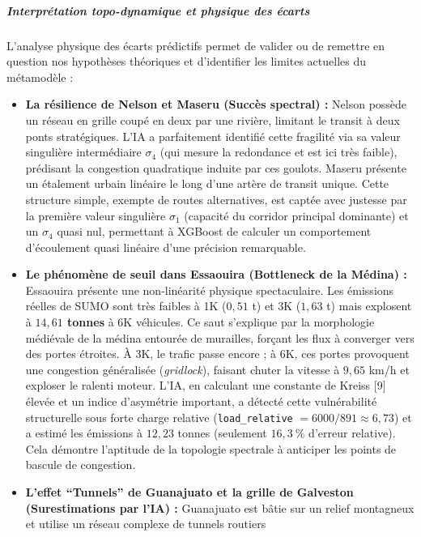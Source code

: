 \documentclass[10pt, a4paper]{article}
\begin{document}
\subparagraph{Interprétation topo-dynamique et physique des
écarts}\label{interpruxe9tation-topo-dynamique-et-physique-des-uxe9carts}

L'analyse physique des écarts prédictifs permet de valider ou de
remettre en question nos hypothèses théoriques et d'identifier les
limites actuelles du métamodèle :

\begin{itemize}
\item
  \textbf{La résilience de Nelson et Maseru (Succès spectral) :} Nelson
  possède un réseau en grille coupé en deux par une rivière, limitant le
  transit à deux ponts stratégiques. L'IA a parfaitement identifié cette
  fragilité via sa valeur singulière intermédiaire \(\sigma_4\) (qui
  mesure la redondance et est ici très faible), prédisant la congestion
  quadratique induite par ces goulots. Maseru présente un étalement
  urbain linéaire le long d'une artère de transit unique. Cette
  structure simple, exempte de routes alternatives, est captée avec
  justesse par la première valeur singulière \(\sigma_1\) (capacité du
  corridor principal dominante) et un \(\sigma_4\) quasi nul, permettant
  à XGBoost de calculer un comportement d'écoulement quasi linéaire
  d'une précision remarquable.
\item
  \textbf{Le phénomène de seuil dans Essaouira (Bottleneck de la Médina)
  :} Essaouira présente une non-linéarité physique spectaculaire. Les
  émissions réelles de SUMO sont très faibles à 1K (\(0,51\) t) et 3K
  (\(1,63\) t) mais explosent à \textbf{\(14,61\) tonnes} à 6K
  véhicules. Ce saut s'explique par la morphologie médiévale de la
  médina entourée de murailles, forçant les flux à converger vers des
  portes étroites. À 3K, le trafic passe encore ; à 6K, ces portes
  provoquent une congestion généralisée (\emph{gridlock}), faisant
  chuter la vitesse à \(9,65\) km/h et exploser le ralenti moteur. L'IA,
  en calculant une constante de Kreiss {[}9{]} élevée et un indice
  d'asymétrie important, a détecté cette vulnérabilité structurelle sous
  forte charge relative (\texttt{load\_relative}
  \(= 6000 / 891 \approx 6,73\)) et a estimé les émissions à \(12,23\)
  tonnes (seulement \(16,3\ \%\) d'erreur relative). Cela démontre
  l'aptitude de la topologie spectrale à anticiper les points de bascule
  de congestion.
\item
  \textbf{L'effet ``Tunnels'' de Guanajuato et la grille de Galveston
  (Surestimations par l'IA) :} Guanajuato est bâtie sur un relief
  montagneux et utilise un réseau complexe de tunnels routiers

\end{itemize}
\end{document}

